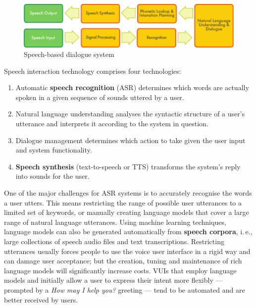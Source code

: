 \begin{multicols}{2}
\begin{figure}[htb]
  \center
  \includegraphics[width=\textwidth]{../_media/english/simple_speech-based_dialogue_architecture}
  \caption{Speech-based dialogue system}
  \label{fig:dialoguearch_en}
\end{figure}

Speech interaction technology comprises four technologies: 

\begin{enumerate}
\item Automatic \textbf{speech recognition} (ASR) determines which words are actually spoken in a given sequence of sounds uttered by a user.  
\item Natural language understanding analyses the syntactic structure of a user’s utterance and interprets it according to the system in question.
\item Dialogue management determines which action to take given the user input and system functionality.   
\item \textbf{Speech synthesis} (text-to-speech or TTS) transforms the system’s reply into sounds for the user.
\end{enumerate}

One of the major challenges for ASR systems is to accurately recognise the words a user utters. This means restricting the range of possible user utterances to a limited set of keywords, or manually creating language models that cover a large range of natural language utterances. Using machine learning techniques, language models can also be generated automatically from \textbf{speech corpora}, i.\,e., large collections of speech audio files and text transcriptions. Restricting utterances usually forces people to use the voice user interface in a rigid way and can damage user acceptance; but the creation, tuning and maintenance of rich language models will significantly increase costs. VUIs that employ language models and initially allow a user to express their intent more flexibly — prompted by a \textit{How may I help you?} greeting — tend to be automated and are better received by users.


\end{multicols}
